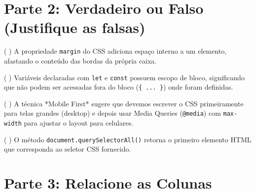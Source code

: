 \documentclass[12pt,a4paper]{article}
\newcommand{\justificativa}[1]{\iftoggle{gabarito}{\vspace{0.2cm}\textbf{\color{corGabarito}Justificativa:} \color{corGabarito}#1}{\vspace{0.8cm}}}
\begin{document}
\newpage
\section*{Parte 2: Verdadeiro ou Falso (Justifique as falsas)}

\begin{tcolorbox}[colback=white, colframe=azulTitulo, title=Questão 5: Box Model]
    ( ) A propriedade \texttt{margin} do CSS adiciona espaço interno a um elemento, afastando o conteúdo das bordas da própria caixa.
    \justificativa{Falso. O \texttt{margin} adiciona espaço EXTERNO (entre a borda e outros elementos). O espaço INTERNO é o \texttt{padding}.}
\end{tcolorbox}

\begin{tcolorbox}[colback=white, colframe=azulTitulo, title=Questão 6: Escopo JS]
    ( ) Variáveis declaradas com \texttt{let} e \texttt{const} possuem escopo de bloco, significando que não podem ser acessadas fora do bloco (\texttt{\{ ... \}}) onde foram definidas.
    \justificativa{Verdadeiro.}
\end{tcolorbox}

\begin{tcolorbox}[colback=white, colframe=azulTitulo, title=Questão 7: Responsividade]
    ( ) A técnica *Mobile First* sugere que devemos escrever o CSS primeiramente para telas grandes (desktop) e depois usar Media Queries (\texttt{@media}) com \texttt{max-width} para ajustar o layout para celulares.
    \justificativa{Falso. A técnica Mobile First escreve o CSS base para celulares primeiro e usa Media Queries com \texttt{min-width} para adaptar o layout em telas maiores.}
\end{tcolorbox}

\begin{tcolorbox}[colback=white, colframe=azulTitulo, title=Questão 8: Manipulação DOM]
    ( ) O método \texttt{document.querySelectorAll()} retorna o primeiro elemento HTML que corresponda ao seletor CSS fornecido.
    \justificativa{Falso. Ele retorna uma lista (NodeList) com TODOS os elementos que correspondem ao seletor. O método que retorna apenas o primeiro é o \texttt{querySelector()}.}
\end{tcolorbox}


\section*{Parte 3: Relacione as Colunas}
\end{document}
